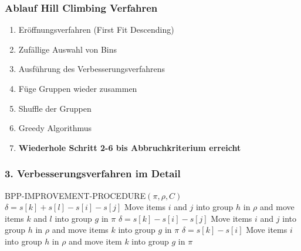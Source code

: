 \documentclass{beamer}
\begin{document}
\begin{frame}
\frametitle{Ablauf Hill Climbing Verfahren}
\begin{footnotesize}
\begin{enumerate}
\item Eröffnungsverfahren (First Fit Descending)
\item Zufällige Auswahl von Bins 
\item Ausführung des Verbesserungsverfahrens
\item Füge Gruppen wieder zusammen
\item Shuffle der Gruppen
\item Greedy Algorithmus
\item \textbf{Wiederhole Schritt 2-6 bis Abbruchkriterium erreicht}
\end{enumerate}
\end{footnotesize}
\end{frame}
%


\begin{frame}
\frametitle{3. Verbesserungsverfahren im Detail}
\begin{algorithm}[H]
\begin{algorithmic}[1]
\begin{scriptsize}
\STATE BPP-IMPROVEMENT-PROCEDURE$(\pi,\rho,C)$
\STATE $\delta = s[k] + s[l] - s[i] - s[j]$
\STATE Move items $i$ and $j$ into group $h$ in $\rho$ and move items $k$ and $l$ into group $g$ in $\pi$
\ENDIF
\ENDFOR
\ENDFOR
\ENDFOR
{}
\STATE $\delta = s[k] - s[i] - s[j]$
\STATE Move items $i$ and $j$ into group $h$ in $\rho$ and move items $k$ into group $g$ in $\pi$
\ENDIF
\ENDFOR
\ENDFOR
\ENDFOR
{}
\STATE $\delta = s[k] - s[i]$
\STATE Move items $i$  into group $h$ in $\rho$ and move item $k$ into group $g$ in $\pi$
\ENDIF
\ENDFOR
\ENDFOR
\ENDFOR
\ENDFOR
\end{scriptsize}
\end{algorithmic}
\end{algorithm}
\end{frame}
\end{document}
